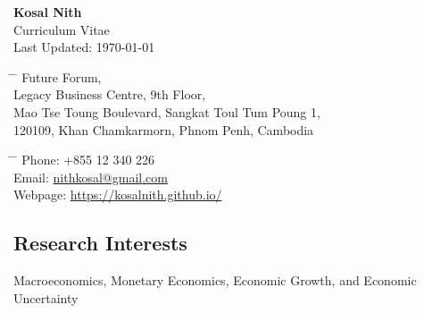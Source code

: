 \documentclass[10pt,a4paper]{article}
\begin{document}
\LARGE{\textbf{Kosal Nith}}\\
	\normalsize{Curriculum Vitae\\
	Last Updated:	\today}

\parbox{0.5\textwidth}{ %
	\begin{tabbing} %
		\hspace{3cm} \= \hspace{4cm} \= \kill %
			Future Forum,\\ 
			Legacy Business Centre, 9th Floor, \\
			Mao Tse Toung Boulevard, Sangkat Toul Tum Poung 1, \\
			120109, Khan Chamkarmorn, Phnom Penh, Cambodia
			
		
	\end{tabbing}}
\hfill %
\parbox{0.5\textwidth}{ %
	\begin{tabbing} %
		\hspace{3cm} \= \hspace{4cm} \= \kill %
			Phone: +855 12 340 226 \\ 
			Email: \href{mailto:nithkosal@gmail.com}{nithkosal@gmail.com}\\
			Webpage: \href{https://kosalnith.github.io/}{https://kosalnith.github.io/}  
	\end{tabbing}}
\vspace{-1em}

\subsection*{Research Interests}	

	Macroeconomics, Monetary Economics, Economic Growth, and Economic Uncertainty

\end{document}
